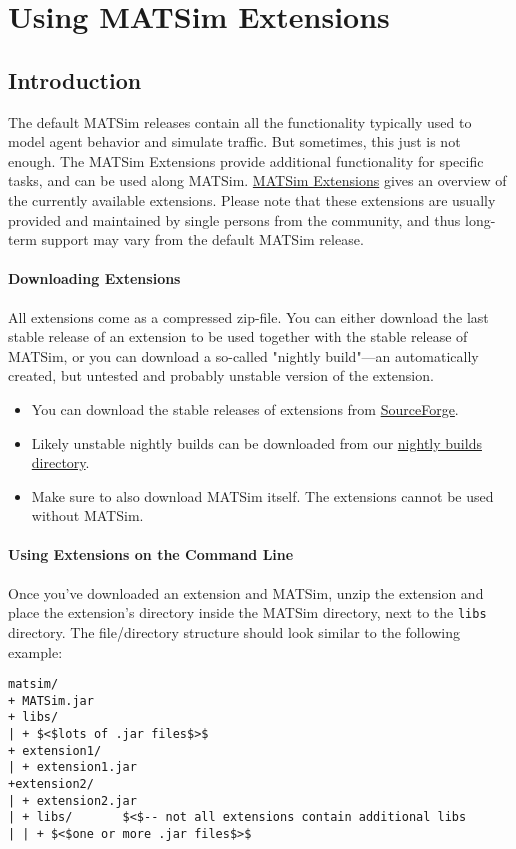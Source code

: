 \chapter{Using MATSim Extensions}

\section{Introduction}

The default MATSim releases contain all the functionality typically  used to model agent behavior and simulate traffic. But sometimes, this  just is not enough. The MATSim Extensions provide additional  functionality for specific tasks, and can be used along MATSim. \href{http://www.matsim.org/extensions}{MATSim Extensions}  gives an overview of the currently available extensions. Please note  that these extensions are usually provided and maintained by single  persons from the community, and thus long-term support may vary from the  default MATSim release.

\subsubsection{Downloading Extensions}

All extensions come as a compressed zip-file. You can either download  the last stable release of an extension to be used together with the  stable release of MATSim, or you can download a so-called "nightly  build"—an automatically created, but untested and probably unstable  version of the extension.
\begin{itemize}
	\item You can download the stable releases of extensions from \href{http://sourceforge.net/projects/matsim/files/MATSim/}{SourceForge}.
	\item Likely unstable nightly builds can be downloaded from our \href{http://matsim.org/files/builds/}{nightly builds directory}.
	\item Make sure to also download MATSim itself. The extensions cannot be used without MATSim.
\end{itemize}

\subsubsection{Using Extensions on the Command Line}

Once you've downloaded an extension and MATSim, unzip the extension  and place the extension's directory inside the MATSim directory, next to  the 
\texttt{libs} directory. The file/directory structure should look similar to the following example:
\begin{verbatim}
matsim/
+ MATSim.jar
+ libs/
| + $<$lots of .jar files$>$
+ extension1/
| + extension1.jar
+extension2/
| + extension2.jar
| + libs/       $<$-- not all extensions contain additional libs
| | + $<$one or more .jar files$>$
\end{verbatim}

